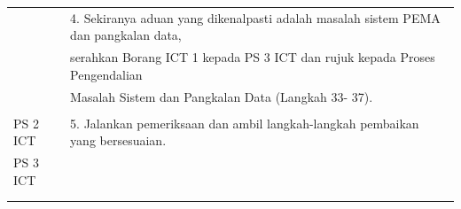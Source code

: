\documentclass[
]{article}
\begin{document}
\begin{longtable}[]{@{}ll@{}}
\begin{minipage}[t]{0.23\columnwidth}\raggedright
\strut
\end{minipage} & \begin{minipage}[t]{0.71\columnwidth}\raggedright
4. Sekiranya aduan yang dikenalpasti adalah masalah sistem PEMA dan
pangkalan data,\strut
\end{minipage}\tabularnewline
\begin{minipage}[t]{0.23\columnwidth}\raggedright
\strut
\end{minipage} & \begin{minipage}[t]{0.71\columnwidth}\raggedright
serahkan Borang ICT 1 kepada PS 3 ICT dan rujuk kepada Proses
Pengendalian\strut
\end{minipage}\tabularnewline
\begin{minipage}[t]{0.23\columnwidth}\raggedright
\strut
\end{minipage} & \begin{minipage}[t]{0.71\columnwidth}\raggedright
Masalah Sistem dan Pangkalan Data (Langkah 33- 37).\strut
\end{minipage}\tabularnewline
\begin{minipage}[t]{0.23\columnwidth}\raggedright
\strut
\end{minipage} & \begin{minipage}[t]{0.71\columnwidth}\raggedright
\strut
\end{minipage}\tabularnewline
\begin{minipage}[t]{0.23\columnwidth}\raggedright
PS 2 ICT\strut
\end{minipage} & \begin{minipage}[t]{0.71\columnwidth}\raggedright
5. Jalankan pemeriksaan dan ambil langkah-langkah pembaikan yang
bersesuaian.\strut
\end{minipage}\tabularnewline
\begin{minipage}[t]{0.23\columnwidth}\raggedright
PS 3 ICT\strut
\end{minipage} & \begin{minipage}[t]{0.71\columnwidth}\raggedright
\strut
\end{minipage}\tabularnewline
\begin{minipage}[t]{0.23\columnwidth}\raggedright
\strut
\end{minipage} & \begin{minipage}[t]{0.71\columnwidth}\raggedright
\strut
\end{minipage}\tabularnewline
\begin{minipage}[t]{0.23\columnwidth}\raggedright

\end{minipage}
\end{longtable}
\end{document}
